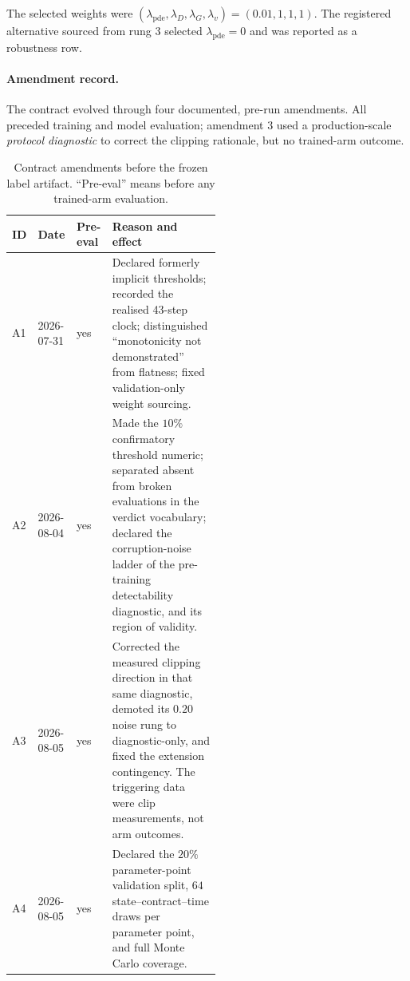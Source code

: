 \documentclass{article}
\begin{document}
The selected weights were
$(\lambda_{\mathrm{pde}},\lambda_D,\lambda_G,\lambda_v)
=(0.01,1,1,1)$. The registered alternative sourced from rung 3 selected
$\lambda_{\mathrm{pde}}=0$ and was reported as a robustness row.

\paragraph{Amendment record.} The contract evolved through four documented,
pre-run amendments. All preceded training and model evaluation; amendment 3 used a
production-scale \emph{protocol diagnostic} to correct the clipping rationale, but
no trained-arm outcome.

\begin{table}[h]
\caption{Contract amendments before the frozen label artifact. ``Pre-eval'' means
before any trained-arm evaluation.}
\label{tab:amendments-s2s}
\centering\footnotesize\setlength{\tabcolsep}{4pt}
\begin{tabular}{@{}lll p{0.52\linewidth}@{}}
\toprule
ID & Date & Pre-eval & Reason and effect \\
\midrule
A1 & 2026-07-31 & yes & Declared formerly implicit thresholds; recorded the realised 43-step clock; distinguished ``monotonicity not demonstrated'' from flatness; fixed validation-only weight sourcing. \\
A2 & 2026-08-04 & yes & Made the $10\%$ confirmatory threshold numeric; separated absent from broken evaluations in the verdict vocabulary; declared the corruption-noise ladder of the pre-training detectability diagnostic, and its region of validity. \\
A3 & 2026-08-05 & yes & Corrected the measured clipping direction in that same diagnostic, demoted its $0.20$ noise rung to diagnostic-only, and fixed the extension contingency. The triggering data were clip measurements, not arm outcomes. \\
A4 & 2026-08-05 & yes & Declared the $20\%$ parameter-point validation split, $64$ state--contract--time draws per parameter point, and full Monte Carlo coverage. \\
\bottomrule
\end{tabular}
\end{table}
\end{document}

